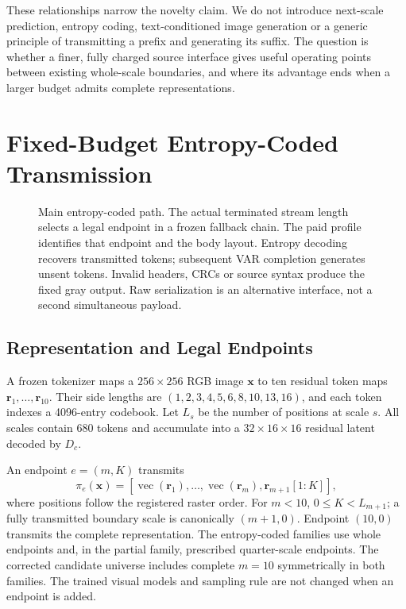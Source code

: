 These relationships narrow the novelty claim. We do not introduce next-scale prediction, entropy coding, text-conditioned image generation or a generic principle of transmitting a prefix and generating its suffix. The question is whether a finer, fully charged source interface gives useful operating points between existing whole-scale boundaries, and where its advantage ends when a larger budget admits complete representations.

\section{Fixed-Budget Entropy-Coded Transmission}
\begin{figure}[t]
\centering

\caption{Main entropy-coded path. The actual terminated stream length selects a legal endpoint in a frozen fallback chain. The paid profile identifies that endpoint and the body layout. Entropy decoding recovers transmitted tokens; subsequent VAR completion generates unsent tokens. Invalid headers, CRCs or source syntax produce the fixed gray output. Raw serialization is an alternative interface, not a second simultaneous payload.}
\label{fig:system}
\end{figure}

\subsection{Representation and Legal Endpoints}
A frozen tokenizer maps a $256\times256$ RGB image $\mathbf x$ to ten residual token maps $\mathbf r_1,\ldots,\mathbf r_{10}$. Their side lengths are $(1,2,3,4,5,6,8,10,13,16)$, and each token indexes a 4096-entry codebook. Let $L_s$ be the number of positions at scale $s$. All scales contain 680 tokens and accumulate into a $32\times16\times16$ residual latent decoded by $D_c$.

An endpoint $e=(m,K)$ transmits
\begin{equation}
 \pi_e(\mathbf x)=[\operatorname{vec}(\mathbf r_1),\ldots,\operatorname{vec}(\mathbf r_m),\mathbf r_{m+1}[1{:}K]],
\label{eq:endpoint}
\end{equation}
where positions follow the registered raster order. For $m<10$, $0\leq K<L_{m+1}$; a fully transmitted boundary scale is canonically $(m+1,0)$. Endpoint $(10,0)$ transmits the complete representation. The entropy-coded families use whole endpoints and, in the partial family, prescribed quarter-scale endpoints. The corrected candidate universe includes complete $m=10$ symmetrically in both families. The trained visual models and sampling rule are not changed when an endpoint is added.

